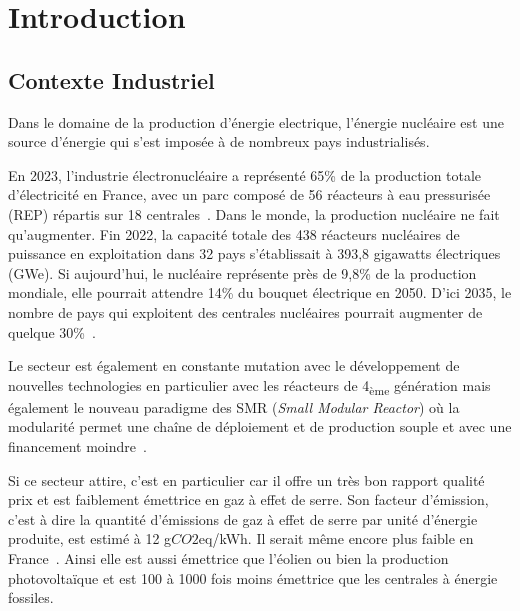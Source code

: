 
\chapter{Introduction}

\section{Contexte Industriel}

Dans le domaine de la production d'énergie electrique, l'énergie nucléaire est une source d'énergie qui s'est imposée à de nombreux pays industrialisés.

En 2023, l'industrie électronucléaire a représenté 65\% de la production totale d'électricité en France, avec un parc composé de 56 réacteurs à eau pressurisée (REP) répartis sur 18 centrales~\cite{rte2023}. Dans le monde, la production nucléaire ne fait qu'augmenter. Fin 2022, la capacité totale des 438 réacteurs nucléaires de puissance en exploitation dans 32 pays s’établissait à 393,8 gigawatts électriques (GWe). Si aujourd'hui, le nucléaire représente près de 9,8\% de la production mondiale, elle pourrait attendre 14\% du bouquet électrique en 2050. D'ici 2035, le nombre de pays qui exploitent des centrales nucléaires pourrait augmenter de quelque 30\%~\cite{aiea2023}.

Le secteur est également en constante mutation avec le développement de nouvelles technologies en particulier avec les réacteurs de 4\textsubscript{ème} génération mais également le nouveau paradigme des SMR (\textit{Small Modular Reactor}) où la modularité permet une chaîne de déploiement et de production souple et avec une financement moindre~\cite{academie2022}.

Si ce secteur attire, c'est en particulier car il offre un très bon rapport qualité prix et est faiblement émettrice en gaz à effet de serre. Son facteur d'émission, c'est à dire la quantité d'émissions de gaz à effet de serre par unité d'énergie produite, est estimé à 12 g$CO2$eq/kWh. Il serait même encore plus faible en France~\cite{schlomer_technology-specific_nodate}. Ainsi elle est aussi émettrice que l'éolien ou bien la production photovoltaïque et est 100 à 1000 fois moins émettrice que les centrales à énergie fossiles.

